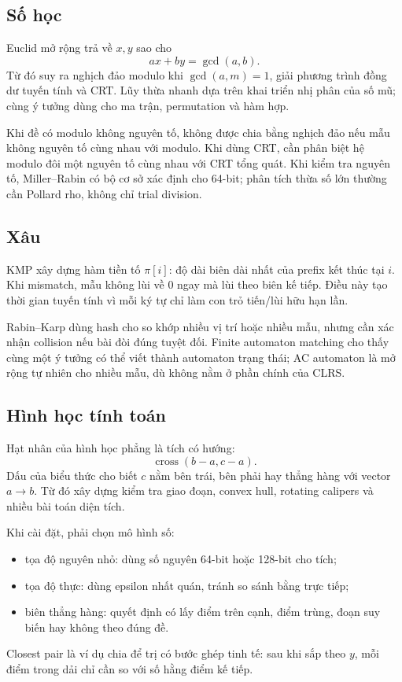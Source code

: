 \documentclass[11pt]{article}
\begin{document}
\subsection{Số học}

Euclid mở rộng trả về \(x,y\) sao cho
\[
  ax+by=\gcd(a,b).
\]
Từ đó suy ra nghịch đảo modulo khi \(\gcd(a,m)=1\), giải phương trình đồng dư
tuyến tính và CRT. Lũy thừa nhanh dựa trên khai triển nhị phân của số mũ; cùng
ý tưởng dùng cho ma trận, permutation và hàm hợp.

Khi đề có modulo không nguyên tố, không được chia bằng nghịch đảo nếu mẫu không
nguyên tố cùng nhau với modulo. Khi dùng CRT, cần phân biệt hệ modulo đôi một
nguyên tố cùng nhau với CRT tổng quát. Khi kiểm tra nguyên tố, Miller--Rabin có
bộ cơ sở xác định cho 64-bit; phân tích thừa số lớn thường cần Pollard rho,
không chỉ trial division.

\subsection{Xâu}

KMP xây dựng hàm tiền tố \(\pi[i]\): độ dài biên dài nhất của prefix kết thúc
tại \(i\). Khi mismatch, mẫu không lùi về 0 ngay mà lùi theo biên kế tiếp. Điều
này tạo thời gian tuyến tính vì mỗi ký tự chỉ làm con trỏ tiến/lùi hữu hạn lần.

Rabin--Karp dùng hash cho so khớp nhiều vị trí hoặc nhiều mẫu, nhưng cần xác
nhận collision nếu bài đòi đúng tuyệt đối. Finite automaton matching cho thấy
cùng một ý tưởng có thể viết thành automaton trạng thái; AC automaton là mở
rộng tự nhiên cho nhiều mẫu, dù không nằm ở phần chính của CLRS.

\subsection{Hình học tính toán}

Hạt nhân của hình học phẳng là tích có hướng:
\[
  \operatorname{cross}(b-a,c-a).
\]
Dấu của biểu thức cho biết \(c\) nằm bên trái, bên phải hay thẳng hàng với
vector \(a\to b\). Từ đó xây dựng kiểm tra giao đoạn, convex hull, rotating
calipers và nhiều bài toán diện tích.

Khi cài đặt, phải chọn mô hình số:
\begin{itemize}
  \item tọa độ nguyên nhỏ: dùng số nguyên 64-bit hoặc 128-bit cho tích;
  \item tọa độ thực: dùng epsilon nhất quán, tránh so sánh bằng trực tiếp;
  \item biên thẳng hàng: quyết định có lấy điểm trên cạnh, điểm trùng, đoạn suy
        biến hay không theo đúng đề.
\end{itemize}
Closest pair là ví dụ chia để trị có bước ghép tinh tế: sau khi sắp theo \(y\),
mỗi điểm trong dải chỉ cần so với số hằng điểm kế tiếp.
\end{document}
